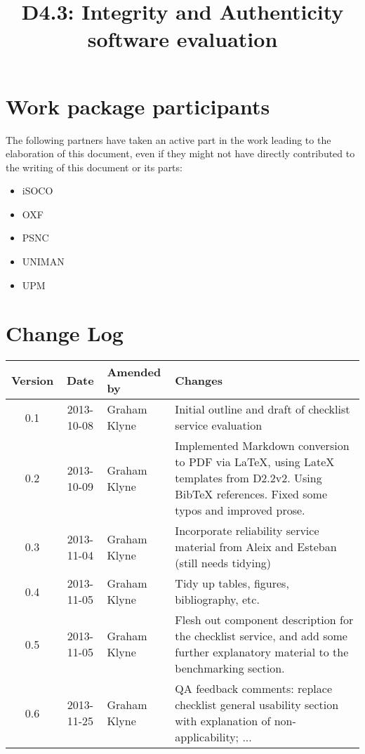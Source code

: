 \documentclass[a4paper, twoside, 11pt]{article}
\title{D4.3: Integrity and Authenticity software evaluation}
\begin{document}
\maketitle

\section*{Work package participants} The following partners have taken an active part in the work leading to the elaboration of this document, even if they might not have directly contributed to the writing of this document or its parts: %
\begin{itemize}
\item iSOCO
\item OXF
\item PSNC
\item UNIMAN
\item UPM
\end{itemize}

\section*{Change Log}
\begin{centering}

\begin{tabular}{|c|c|p{4.92cm}|p{6.5cm}|}

\hline \textbf{Version} & \textbf{Date} & \textbf{Amended by} & \textbf{Changes} \\ \hline
0.1 & 2013-10-08 & Graham Klyne & Initial outline and draft of checklist service evaluation \\ \hline
0.2 & 2013-10-09 & Graham Klyne & Implemented Markdown conversion to PDF via LaTeX, using LateX templates from D2.2v2.  Using BibTeX references.  Fixed some typos and improved prose. \\ \hline
0.3 & 2013-11-04 & Graham Klyne & Incorporate reliability service material from Aleix and Esteban (still needs tidying) \\ \hline
0.4 & 2013-11-05 & Graham Klyne & Tidy up tables, figures, bibliography, etc. \\ \hline
0.5 & 2013-11-05 & Graham Klyne & Flesh out component description for the checklist service, and add some further explanatory material to the benchmarking section. \\ \hline
0.6 & 2013-11-25 & Graham Klyne & QA feedback comments:
replace checklist general usability section with explanation of non-applicability;
...
\\ \hline






\end{tabular}

\end{centering}
\clearpage
\end{document}
